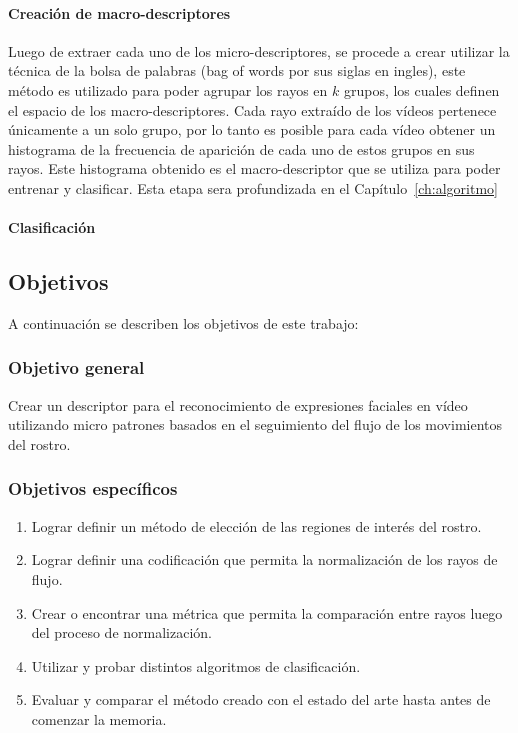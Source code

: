 \paragraph{Creación de macro-descriptores}
\label{ch1:par:macrodescriptores}
Luego de extraer cada uno de los micro-descriptores, se procede a crear utilizar la técnica de la bolsa de palabras (bag of words por sus siglas en ingles), este método es utilizado para poder agrupar los rayos en $k$ grupos, los cuales definen el espacio de los macro-descriptores. Cada rayo extraído de los vídeos pertenece únicamente a un solo grupo, por lo tanto es posible para cada vídeo obtener un histograma de la frecuencia de aparición de cada uno de estos grupos en sus rayos. Este histograma obtenido es el macro-descriptor que se utiliza para poder entrenar y clasificar. Esta etapa sera profundizada en el Capítulo~\ref{ch:algoritmo}

\paragraph{Clasificación}
\label{ch1:par:clasificacion}



\subsection{Objetivos}
\label{subsec:objetivos}
A continuación se describen los objetivos de este trabajo:

\subsubsection{Objetivo general}
\label{subsubsec:objgeneral}
Crear un descriptor para el reconocimiento de expresiones faciales en vídeo utilizando micro patrones basados en el seguimiento del flujo de los movimientos del rostro.

\subsubsection{Objetivos específicos}
\label{subsubsec:objgeneral}
	\begin{enumerate}
		\item Lograr definir un método de elección de las regiones de interés del rostro.
		\item Lograr definir una codificación que permita la normalización de los rayos de flujo.
		\item Crear o encontrar una métrica que permita la comparación entre rayos luego del proceso de normalización.
		\item Utilizar y probar distintos algoritmos de clasificación.
		\item Evaluar y comparar el método creado con el estado del arte hasta antes de comenzar la memoria. 
	\end{enumerate}
